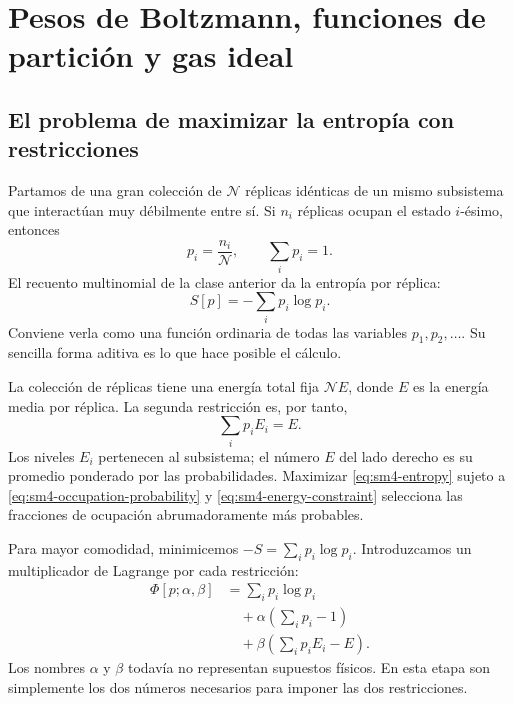 \chapter{Pesos de Boltzmann, funciones de partición y gas ideal}


\section{El problema de maximizar la entropía con restricciones}

Partamos de una gran colección de \(\mathcal N\) réplicas idénticas de un mismo subsistema que interactúan muy débilmente entre sí. Si \(n_i\) réplicas ocupan el estado \(i\)-ésimo, entonces
\begin{equation}
 p_i=\frac{n_i}{\mathcal N},
 \qquad
 \sum_i p_i=1.
 \label{eq:sm4-occupation-probability}
\end{equation}
El recuento multinomial de la clase anterior da la entropía por réplica:
\begin{equation}
 S[p]=-\sum_i p_i\log p_i.
 \label{eq:sm4-entropy}
\end{equation}
Conviene verla como una función ordinaria de todas las variables \(p_1,p_2,\ldots\). Su sencilla forma aditiva es lo que hace posible el cálculo.

La colección de réplicas tiene una energía total fija \(\mathcal N E\), donde \(E\) es la energía media por réplica. La segunda restricción es, por tanto,
\begin{equation}
 \sum_i p_iE_i=E.
 \label{eq:sm4-energy-constraint}
\end{equation}
Los niveles \(E_i\) pertenecen al subsistema; el número \(E\) del lado derecho es su promedio ponderado por las probabilidades. Maximizar \eqref{eq:sm4-entropy} sujeto a \eqref{eq:sm4-occupation-probability} y \eqref{eq:sm4-energy-constraint} selecciona las fracciones de ocupación abrumadoramente más probables.

Para mayor comodidad, minimicemos \(-S=\sum_i p_i\log p_i\). Introduzcamos un multiplicador de Lagrange por cada restricción:
\begin{equation}
 \begin{aligned}
 \Phi[p;\alpha,\beta]
 &=\sum_i p_i\log p_i\\
 &\quad+\alpha\left(\sum_i p_i-1\right)\\
 &\quad+\beta\left(\sum_i p_iE_i-E\right).
 \end{aligned}
 \label{eq:sm4-augmented-functional}
\end{equation}
Los nombres \(\alpha\) y \(\beta\) todavía no representan supuestos físicos. En esta etapa son simplemente los dos números necesarios para imponer las dos restricciones.

